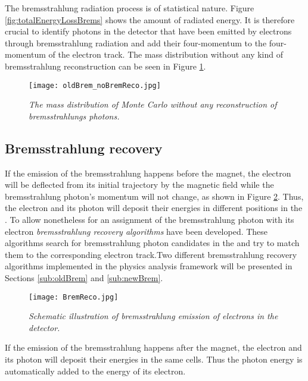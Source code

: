 The bremsstrahlung radiation process is of statistical nature. Figure \ref{fig:totalEnergyLossBrems} shows the amount of radiated energy. It is therefore crucial to identify photons in the detector that have been emitted by electrons through bremsstrahlung radiation and add their four-momentum to the four-momentum of the electron track. The \Bd mass distribution without any kind of bremsstrahlung reconstruction can be seen in Figure \ref{fig:noBremReco}.
\newpage
\begin{figure}[ht]
  	\centering
    \texttt{[image: oldBrem\_noBremReco.jpg]}
  \caption{\textit{The \Bd mass distribution of \BdKstee \lhcb Monte Carlo without any reconstruction of bremsstrahlungs photons.}}
  \label{fig:noBremReco}
\end{figure}

\subsection{Bremsstrahlung recovery}
\label{sec:bremsstrahlungrecovery}
If the emission of the bremsstrahlung happens before the magnet, the electron will be deflected from its initial trajectory by the magnetic field while the bremsstrahlung photon's momentum will not change, as shown in Figure \ref{fig:bremsstrahlung}. Thus, the electron and its photon will deposit their energies in different positions in the \ecal. To allow nonetheless for an assignment of the bremsstrahlung photon with its electron \textit{bremsstrahlung recovery algorithms} have been developed. These algorithms search for bremsstrahlung photon candidates in the \ecal and try to match them to the corresponding electron track.Two different bremsstrahlung recovery algorithms implemented in the \lhcb physics analysis framework will be presented in Sections \ref{sub:oldBrem} and \ref{sub:newBrem}.
\begin{figure}[ht]
\vspace*{-0.4cm}
  \begin{center}
    \texttt{[image: BremReco.jpg]}
  \end{center}
  \vspace*{-0.5cm}
  \caption{\textit{Schematic illustration of bremsstrahlung emission of electrons in the \lhcb detector.}}
  \label{fig:bremsstrahlung}
\end{figure}
If the emission of the bremsstrahlung happens after the magnet, the electron and its photon will deposit their energies in the same \ecal cells. Thus the photon energy is automatically added to the energy of its electron. \\


